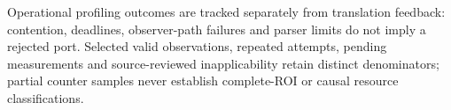 Operational profiling outcomes are tracked separately from translation feedback: contention, deadlines, observer-path failures and parser limits do not imply a rejected port. Selected valid observations, repeated attempts, pending measurements and source-reviewed inapplicability retain distinct denominators; partial counter samples never establish complete-ROI or causal resource classifications.
